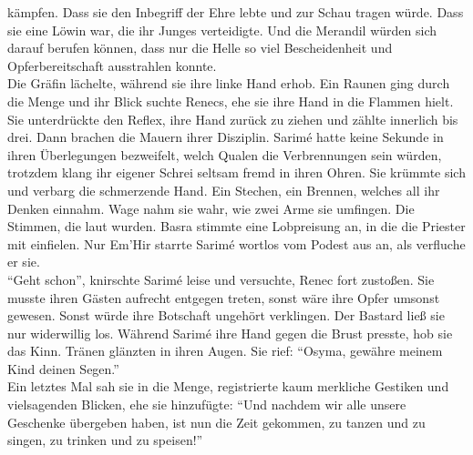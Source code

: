 kämpfen. Dass sie den Inbegriff der Ehre lebte und zur Schau tragen würde. Dass sie eine Löwin war, 
die ihr Junges verteidigte. Und die Merandil würden sich darauf berufen können, dass nur die Helle 
so viel Bescheidenheit und Opferbereitschaft ausstrahlen konnte.\\
Die Gräfin lächelte, während sie ihre linke Hand erhob. Ein Raunen ging durch die Menge und ihr 
Blick suchte Renecs, ehe sie ihre Hand in die Flammen hielt. Sie unterdrückte den Reflex, ihre Hand 
zurück zu ziehen und zählte innerlich bis drei. Dann brachen die Mauern ihrer Disziplin. Sarimé 
hatte keine Sekunde in ihren Überlegungen bezweifelt, welch Qualen die Verbrennungen sein würden, 
trotzdem klang ihr eigener Schrei seltsam fremd in ihren Ohren. Sie krümmte sich und verbarg die 
schmerzende Hand. Ein Stechen, ein Brennen, welches all ihr Denken einnahm. Wage nahm sie wahr, wie 
zwei Arme sie umfingen. Die Stimmen, die laut wurden. Basra stimmte eine Lobpreisung an, in die die 
Priester mit einfielen. Nur Em'Hir starrte Sarimé wortlos vom Podest aus an, als verfluche er sie.\\
``Geht schon'', knirschte Sarimé leise und versuchte, Renec fort zustoßen. Sie musste ihren Gästen 
aufrecht entgegen treten, sonst wäre ihre Opfer umsonst gewesen. Sonst würde ihre Botschaft 
ungehört verklingen. Der Bastard ließ sie nur widerwillig los. Während Sarimé ihre Hand gegen die 
Brust presste, hob sie das Kinn. Tränen glänzten in ihren Augen. Sie rief: ``Osyma, gewähre meinem 
Kind deinen Segen.''\\
Ein letztes Mal sah sie in die Menge, registrierte kaum merkliche Gestiken und vielsagenden 
Blicken, ehe sie hinzufügte: ``Und nachdem wir alle unsere Geschenke übergeben haben, ist nun die 
Zeit gekommen, zu tanzen und zu singen, zu trinken und zu speisen!''\\

